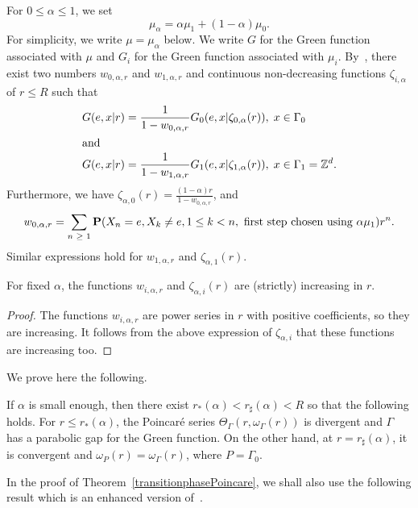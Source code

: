 \documentclass[AHL,Unicode,longabstracts]{cedram}
\newcommand{\Z}{\mathbb{Z}}
\newcommand{\bfP}{\mathbf{P}}
\let\originalleft\left
\let\originalright\right
\renewcommand{\left}{\mathopen{}\mathclose\bgroup\originalleft}
\renewcommand{\right}{\aftergroup\egroup\originalright}
\let\oldin\in
\renewcommand{\in}{\mathchoice{\oldin}{\oldin}{\,\oldin\,}{\,\oldin\,}}
\let\oldge\ge
\renewcommand{\ge}{\mathchoice{\oldge}{\oldge}{\,\oldge\,}{\,\oldge\,}}
\begin{document}
For $0\leq \alpha\leq 1$, we set
\[
\mu_\alpha=\alpha \mu_1+(1-\alpha)\mu_0.
\]
For simplicity, we write $\mu=\mu_\alpha$ below. We write $G$ for the Green function associated with $\mu$ and $G_{i}$ for the Green function associated with $\mu_i$. By~\cite[(10), (11)]{DWY}, there exist two numbers $w_{0,\alpha,r}$ and $w_{1,\alpha,r}$ and continuous non-decreasing functions $\zeta_{i,\alpha}$ of $r\leq R$ such that
\begin{align}
G(e,x|r) &=\frac{1}{1-w_{0,\alpha,r}}G_0(e,x|\zeta_{0,\alpha}(r)),
\; x\in \Gamma_0\label{equationG0}\\
\intertext{and}
G(e,x|r)
&=\frac{1}{1-w_{1,\alpha,r}}G_1(e,x|\zeta_{1,\alpha}(r)),
\; x\in \Gamma_1=\Z^d.\label{equationG1}
\end{align}
Furthermore, we have $\zeta_{\alpha, 0}(r) = \frac{(1 - \alpha) r}{1 - w_{0,\alpha,r}}$, and
\begin{equation}\label{wralpha}
w_{0, \alpha,r} = \sum_{n \ge 1} \bfP \left(X_n = e, X_k \neq e, 1 \leq k < n, \text{ first step chosen using } \alpha \mu_1 \right) r^n.
\end{equation}
Similar expressions hold for $w_{1,\alpha,r}$ and $\zeta_{\alpha,1}(r)$.

\begin{lemm}
For fixed $\alpha$, the functions $w_{i,\alpha,r}$ and $\zeta_{\alpha,i}(r)$ are (strictly) increasing in $r$.
\end{lemm}

\begin{proof}
The functions $w_{i,\alpha,r}$ are power series in $r$ with positive coefficients, so they are increasing. It follows from the above expression of $\zeta_{\alpha,i}$ that these functions are increasing too.
\end{proof}



We prove here the following.
\begin{theo}\label{transitionphasePoincare}
If $\alpha$ is small enough, then there exist $r_*(\alpha)<r_\sharp(\alpha) <R$ so that the following holds. For $r\leq r_*(\alpha)$, the Poincaré series $\Theta_{\Gamma}(r,\omega_{\Gamma}(r))$ is divergent and $\Gamma$ has a parabolic gap for the Green function. On the other hand, at $r=r_\sharp(\alpha)$, it is convergent and $\omega_P(r)=\omega_\Gamma(r)$, where $P=\Gamma_0$.
\end{theo}


In the proof of Theorem~\ref{transitionphasePoincare}, we shall also use the following result which is an enhanced version of~\cite[(14)]{DWY}.
\end{document}
